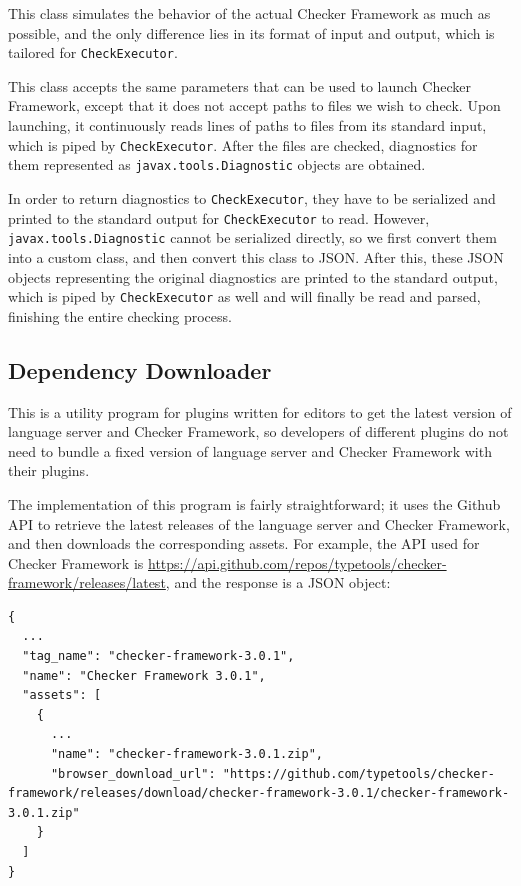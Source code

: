 \documentclass{article}
\begin{document}
This class simulates the behavior of the actual Checker Framework as much as possible, and the only difference lies in its format of input and output, which is tailored for \verb|CheckExecutor|.

This class accepts the same parameters that can be used to launch Checker Framework, except that it does not accept paths to files we wish to check. Upon launching, it continuously reads lines of paths to files from its standard input, which is piped by \verb|CheckExecutor|. After the files are checked, diagnostics for them represented as \verb|javax.tools.Diagnostic| objects are obtained.

In order to return diagnostics to \verb|CheckExecutor|, they have to be serialized and printed to the standard output for \verb|CheckExecutor| to read. However, \verb|javax.tools.Diagnostic| cannot be serialized directly, so we first convert them into a custom class, and then convert this class to JSON.  After this, these JSON objects representing the original diagnostics are printed to the standard output, which is piped by \verb|CheckExecutor| as well and will finally be read and parsed, finishing the entire checking process.

\subsection{Dependency Downloader}

This is a utility program for plugins written for editors to get the latest version of language server and Checker Framework, so developers of different plugins do not need to bundle a fixed version of language server and Checker Framework with their plugins.

The implementation of this program is fairly straightforward; it uses the Github API to retrieve the latest releases of the language server and Checker Framework, and then downloads the corresponding assets. For example, the API used for Checker Framework is \url{https://api.github.com/repos/typetools/checker-framework/releases/latest}, and the response is a JSON object:

\begin{lstlisting}
{
  ...
  "tag_name": "checker-framework-3.0.1",
  "name": "Checker Framework 3.0.1",
  "assets": [
    {
      ...
      "name": "checker-framework-3.0.1.zip",
      "browser_download_url": "https://github.com/typetools/checker-framework/releases/download/checker-framework-3.0.1/checker-framework-3.0.1.zip"
    }
  ]
}
\end{lstlisting}
\end{document}
